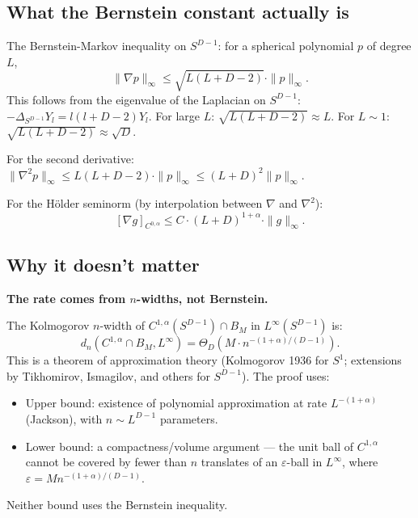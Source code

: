 %
%

\subsection{What the Bernstein constant actually is}

The Bernstein-Markov inequality on $S^{D-1}$: for a spherical polynomial $p$ of degree $L$,
\[
  \|\nabla p\|_\infty \leq \sqrt{L(L + D - 2)} \cdot \|p\|_\infty.
\]
This follows from the eigenvalue of the Laplacian on $S^{D-1}$: $-\Delta_{S^{D-1}} Y_l = l(l+D-2) Y_l$. For large $L$: $\sqrt{L(L+D-2)} \approx L$. For $L \sim 1$: $\sqrt{L(L+D-2)} \approx \sqrt{D}$.

For the second derivative: $\|\nabla^2 p\|_\infty \leq L(L+D-2) \cdot \|p\|_\infty \leq (L+D)^2 \|p\|_\infty$.

For the H\"older seminorm (by interpolation between $\nabla$ and $\nabla^2$):
\[
  [\nabla g]_{C^{0,\alpha}} \leq C \cdot (L + D)^{1+\alpha} \cdot \|g\|_\infty.
\]

\subsection{Why it doesn't matter}

\textbf{The rate comes from $n$-widths, not Bernstein.}

The Kolmogorov $n$-width of $C^{1,\alpha}(S^{D-1}) \cap B_M$ in $L^\infty(S^{D-1})$ is:
\[
  d_n(C^{1,\alpha} \cap B_M, L^\infty) = \Theta_D(M \cdot n^{-(1+\alpha)/(D-1)}).
\]
This is a theorem of approximation theory (Kolmogorov 1936 for $S^1$; extensions by Tikhomirov, Ismagilov, and others for $S^{D-1}$). The proof uses:
\begin{itemize}
  \item Upper bound: existence of polynomial approximation at rate $L^{-(1+\alpha)}$ (Jackson), with $n \sim L^{D-1}$ parameters.
  \item Lower bound: a compactness/volume argument --- the unit ball of $C^{1,\alpha}$ cannot be covered by fewer than $n$ translates of an $\varepsilon$-ball in $L^\infty$, where $\varepsilon = M n^{-(1+\alpha)/(D-1)}$.
\end{itemize}
Neither bound uses the Bernstein inequality.

